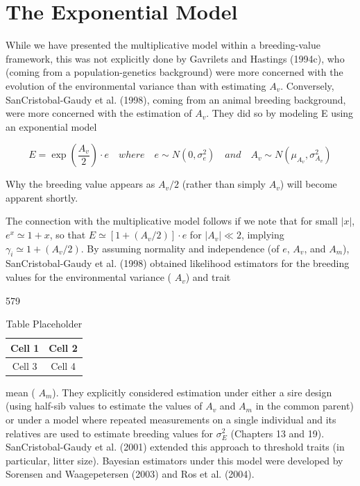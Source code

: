 \documentclass{article}
\begin{document}
\section{The Exponential Model}
While we have presented the multiplicative model within a breeding-value framework, this was not explicitly done by Gavrilets and Hastings (1994c), who (coming from a population-genetics background) were more concerned with the evolution of the environmental variance than with estimating  $ A_{v} $. Conversely, SanCristobal-Gaudy et al. (1998), coming from an animal breeding background, were more concerned with the estimation of  $ A_{v} $. They did so by modeling E using an exponential model

\begin{equation}
E=\exp\left(\frac{A_{v}}{2}\right)\cdot e\quad where\quad e\sim N(0,\sigma_{e}^{2})\quad and\quad A_{v}\sim N(\mu_{A_{v}},\sigma_{A_{v}}^{2})
\tag{17.3a}
\label{eq:17_3a}
\end{equation}

Why the breeding value appears as  $ A_{v}/2 $ (rather than simply  $ A_{v} $) will become apparent shortly.

The connection with the multiplicative model follows if we note that for small  $ |x| $,  $ e^x \simeq 1 + x $, so that  $ E \simeq [1 + (A_v/2)] \cdot e $ for  $ |A_v| \ll 2 $, implying  $ \gamma_i \simeq 1 + (A_v/2) $. By assuming normality and independence (of  $ e $,  $ A_v $, and  $ A_m $), SanCristobal-Gaudy et al. (1998) obtained likelihood estimators for the breeding values for the environmental variance ( $ A_v $) and trait

579

\begin{table}[h]
\centering
\begin{tabular}{|c|c|}
\hline
Cell 1 & Cell 2 \\
\hline
Cell 3 & Cell 4 \\
\hline
\end{tabular}
\caption{Table Placeholder}
\end{table}

mean ( $ A_{m} $). They explicitly considered estimation under either a sire design (using half-sib values to estimate the values of  $ A_{v} $ and  $ A_{m} $ in the common parent) or under a model where repeated measurements on a single individual and its relatives are used to estimate breeding values for  $ \sigma_{E}^{2} $ (Chapters 13 and 19). SanCristobal-Gaudy et al. (2001) extended this approach to threshold traits (in particular, litter size). Bayesian estimators under this model were developed by Sorensen and Waagepetersen (2003) and Ros et al. (2004).
\end{document}
